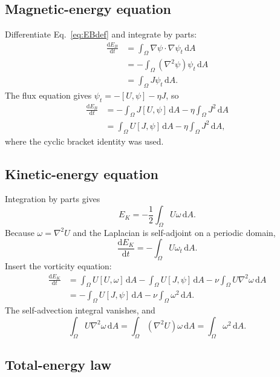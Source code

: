 \documentclass[11pt]{article}
\newcommand{\dd}{\mathrm{d}}
\begin{document}
\subsection{Magnetic-energy equation}

Differentiate Eq.~\eqref{eq:EBdef} and integrate by parts:
\begin{align}
\frac{\dd E_B}{\dd t}
&=\int_\Omega\nabla\psi\cdot\nabla\psi_t\,\dd A\\
&=-\int_\Omega(\nabla^2\psi)\psi_t\,\dd A\\
&=\int_\Omega J\psi_t\,\dd A.
\end{align}
The flux equation gives $\psi_t=-[U,\psi]-\eta J$, so
\begin{align}
\frac{\dd E_B}{\dd t}
&=-\int_\Omega J[U,\psi]\,\dd A
-\eta\int_\Omega J^2\,\dd A\\
&=\int_\Omega U[J,\psi]\,\dd A
-\eta\int_\Omega J^2\,\dd A,
\label{eq:EBbudget}
\end{align}
where the cyclic bracket identity was used.

\subsection{Kinetic-energy equation}

Integration by parts gives
\begin{equation}
E_K=-\frac{1}{2}\int_\Omega U\omega\,\dd A.
\end{equation}
Because $\omega=\nabla^2U$ and the Laplacian is self-adjoint on a periodic domain,
\begin{equation}
\frac{\dd E_K}{\dd t}
=-\int_\Omega U\omega_t\,\dd A.
\end{equation}
Insert the vorticity equation:
\begin{align}
\frac{\dd E_K}{\dd t}
&=\int_\Omega U[U,\omega]\,\dd A
-\int_\Omega U[J,\psi]\,\dd A
-\nu\int_\Omega U\nabla^2\omega\,\dd A\\
&=-\int_\Omega U[J,\psi]\,\dd A
-\nu\int_\Omega\omega^2\,\dd A.
\label{eq:EKbudget}
\end{align}
The self-advection integral vanishes, and
\begin{equation}
\int_\Omega U\nabla^2\omega\,\dd A
=\int_\Omega(\nabla^2U)\omega\,\dd A
=\int_\Omega\omega^2\,\dd A.
\end{equation}

\subsection{Total-energy law}
\end{document}
